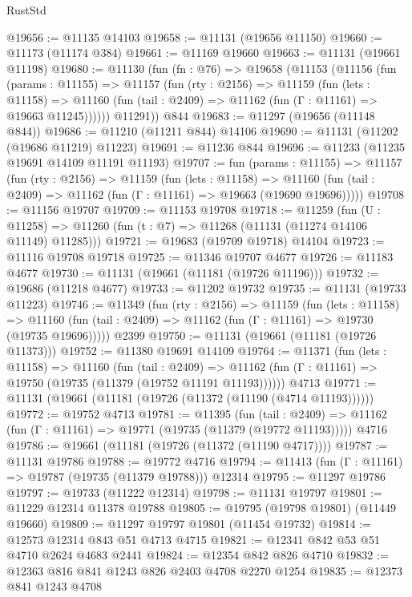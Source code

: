 \begin{lexlean}{RustStd}
\begin{coremodule}
@19656 := @11135 @14103
@19658 := @11131 (@19656 @11150)
@19660 := @11173 (@11174 @384)
@19661 := @11169 @19660
@19663 := @11131 (@19661 @11198)
@19680 := @11130
    (fun (fn : @76) =>
    @19658
      (@11153
        (@11156
          (fun (params : @11155) =>
          @11157
            (fun (rty : @2156) =>
            @11159
              (fun (lets : @11158) =>
              @11160 (fun (tail : @2409) => @11162 (fun (Γ : @11161) => @19663 @11245))))))
        @11291))
    @844
@19683 := @11297 (@19656 (@11148 @844))
@19686 := @11210 (@11211 @844) @14106
@19690 := @11131 (@11202 (@19686 @11219) @11223)
@19691 := @11236 @844
@19696 := @11233 (@11235 @19691 @14109 @11191 @11193)
@19707 := fun (params : @11155) =>
  @11157
    (fun (rty : @2156) =>
    @11159
      (fun (lets : @11158) =>
      @11160 (fun (tail : @2409) => @11162 (fun (Γ : @11161) => @19663 (@19690 @19696)))))
@19708 := @11156 @19707
@19709 := @11153 @19708
@19718 := @11259
    (fun (U : @11258) => @11260 (fun (t : @7) => @11268 (@11131 (@11274 @14106 @11149) @11285)))
@19721 := @19683 (@19709 @19718) @14104
@19723 := @11116 @19708 @19718
@19725 := @11346 @19707 @4677
@19726 := @11183 @4677
@19730 := @11131 (@19661 (@11181 (@19726 @11196)))
@19732 := @19686 (@11218 @4677)
@19733 := @11202 @19732
@19735 := @11131 (@19733 @11223)
@19746 := @11349
    (fun (rty : @2156) =>
    @11159
      (fun (lets : @11158) =>
      @11160 (fun (tail : @2409) => @11162 (fun (Γ : @11161) => @19730 (@19735 @19696)))))
    @2399
@19750 := @11131 (@19661 (@11181 (@19726 @11373)))
@19752 := @11380 @19691 @14109
@19764 := @11371
    (fun (lets : @11158) =>
    @11160
      (fun (tail : @2409) =>
      @11162 (fun (Γ : @11161) => @19750 (@19735 (@11379 (@19752 @11191 @11193))))))
    @4713
@19771 := @11131 (@19661 (@11181 (@19726 (@11372 (@11190 (@4714 @11193))))))
@19772 := @19752 @4713
@19781 := @11395
    (fun (tail : @2409) => @11162 (fun (Γ : @11161) => @19771 (@19735 (@11379 (@19772 @11193)))))
    @4716
@19786 := @19661 (@11181 (@19726 (@11372 (@11190 @4717))))
@19787 := @11131 @19786
@19788 := @19772 @4716
@19794 := @11413 (fun (Γ : @11161) => @19787 (@19735 (@11379 @19788))) @12314
@19795 := @11297 @19786
@19797 := @19733 (@11222 @12314)
@19798 := @11131 @19797
@19801 := @11229 @12314 @11378 @19788
@19805 := @19795 (@19798 @19801) (@11449 @19660)
@19809 := @11297 @19797 @19801 (@11454 @19732)
@19814 := @12573 @12314 @843 @51 @4713 @4715
@19821 := @12341 @842 @53 @51 @4710 @2624 @4683 @2441
@19824 := @12354 @842 @826 @4710
@19832 := @12363 @816 @841 @1243 @826 @2403 @4708 @2270 @1254
@19835 := @12373 @841 @1243 @4708

\end{coremodule}
\end{lexlean}
